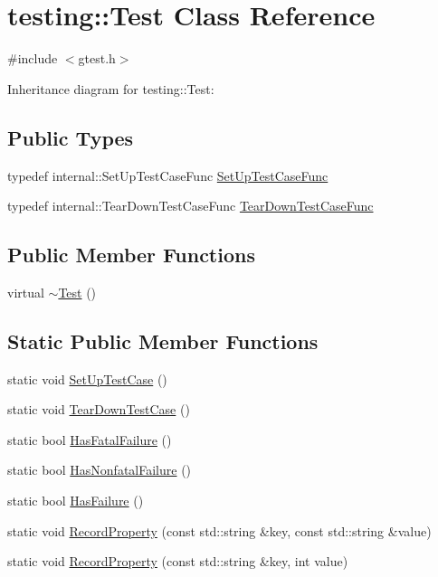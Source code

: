 \hypertarget{classtesting_1_1_test}{}\section{testing\+:\+:Test Class Reference}
\label{classtesting_1_1_test}


{\ttfamily \#include $<$gtest.\+h$>$}



Inheritance diagram for testing\+:\+:Test\+:
\subsection*{Public Types}
\begin{DoxyCompactItemize}
\item 
typedef internal\+::\+Set\+Up\+Test\+Case\+Func \hyperlink{classtesting_1_1_test_a5f2a051d1d99c9b784c666c586186cf9}{Set\+Up\+Test\+Case\+Func}
\item 
typedef internal\+::\+Tear\+Down\+Test\+Case\+Func \hyperlink{classtesting_1_1_test_aa0f532e93b9f3500144c53f31466976c}{Tear\+Down\+Test\+Case\+Func}
\end{DoxyCompactItemize}
\subsection*{Public Member Functions}
\begin{DoxyCompactItemize}
\item 
virtual \hyperlink{classtesting_1_1_test_a2b0a62f1e667bbe8d8cb18d785bfa991}{$\sim$\+Test} ()
\end{DoxyCompactItemize}
\subsection*{Static Public Member Functions}
\begin{DoxyCompactItemize}
\item 
static void \hyperlink{classtesting_1_1_test_a5ccbac42fee8c5b00b0bfe89b6c49d79}{Set\+Up\+Test\+Case} ()
\item 
static void \hyperlink{classtesting_1_1_test_af374706cbaf0ffc460f4fd04e7c150f1}{Tear\+Down\+Test\+Case} ()
\item 
static bool \hyperlink{classtesting_1_1_test_a5e83604628ef542af888d631566ff60c}{Has\+Fatal\+Failure} ()
\item 
static bool \hyperlink{classtesting_1_1_test_a8c00e8cc6fe10616b480bd54d2a426cb}{Has\+Nonfatal\+Failure} ()
\item 
static bool \hyperlink{classtesting_1_1_test_a7a00be7dd0a6bfdc8d47a1b784623613}{Has\+Failure} ()
\item 
static void \hyperlink{classtesting_1_1_test_a1559ce1c83f56993b582650c091535a7}{Record\+Property} (const std\+::string \&key, const std\+::string \&value)
\item 
static void \hyperlink{classtesting_1_1_test_a373da47b491b1e64e355d22d6ec99b5b}{Record\+Property} (const std\+::string \&key, int value)
\end{DoxyCompactItemize}
